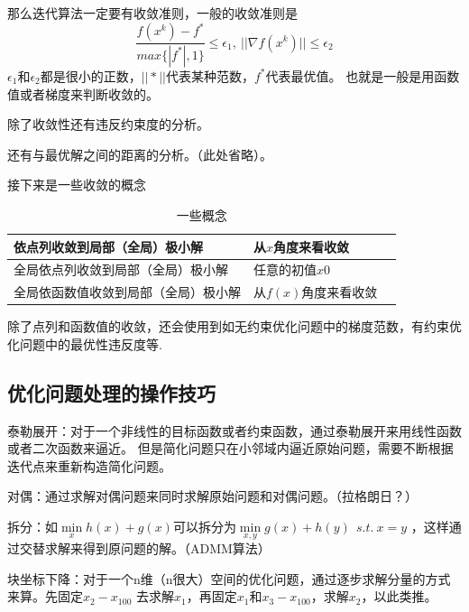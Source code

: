 \documentclass{article}
\begin{document}
那么迭代算法一定要有收敛准则，一般的收敛准则是
\begin{equation}
    \frac{f(x^k)-f^*}{max\{ |f^*|,1\}} \le \epsilon_1 ,\ ||\nabla f(x^k)|| \le \epsilon_2
\end{equation}
$\epsilon_1$和$\epsilon_2$都是很小的正数，$||*||$代表某种范数，$f^*$代表最优值。
也就是一般是用函数值或者梯度来判断收敛的。

除了收敛性还有违反约束度的分析。

还有与最优解之间的距离的分析。（此处省略）。

接下来是一些收敛的概念
\begin{table}[h]
    \centering
    \caption{一些概念}
    \begin{tabular}{|l|l|l|}\hline
    依点列收敛到局部（全局）极小解    &  从$x$角度来看收敛 \\ \hline
    全局依点列收敛到局部（全局）极小解  & 任意的初值$x0$  \\ \hline
    全局依函数值收敛到局部（全局）极小解 &  从$f(x)$角度来看收敛\\ \hline 
    \end{tabular}
\end{table}
除了点列和函数值的收敛，还会使用到如无约束优化问题中的梯度范数，有约束优化问题中的最优性违反度等.
\subsection{优化问题处理的操作技巧}
泰勒展开：对于一个非线性的目标函数或者约束函数，通过泰勒展开来用线性函数或者二次函数来逼近。
但是简化问题只在小邻域内逼近原始问题，需要不断根据迭代点来重新构造简化问题。

对偶：通过求解对偶问题来同时求解原始问题和对偶问题。（拉格朗日？）

拆分：如$\min\limits_{x} h(x)+g(x)$可以拆分为$\min \limits_{x,y} g(x)+h(y) \ \ s.t. \ x=y$
，这样通过交替求解来得到原问题的解。（ADMM算法）

块坐标下降：对于一个n维（n很大）空间的优化问题，通过逐步求解分量的方式来算。先固定$x_2-x_{100}$
去求解$x_1$，再固定$x_1$和$x_3-x_{100}$，求解$x_2$，以此类推。
\end{document}
